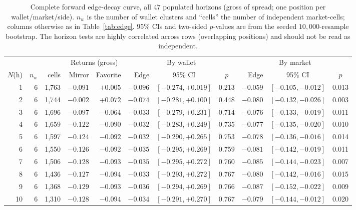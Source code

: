 \documentclass[11pt]{article}
\begin{document}
\begin{table}[p]
\centering
\caption{Complete forward edge-decay curve, all $47$ populated horizons (gross of spread; one
position per wallet/market/side). $n_w$ is the number of wallet clusters and ``cells'' the
number of independent market-cells; columns otherwise as in Table~\ref{tab:edge}. $95\%$ CIs
and two-sided $p$-values are from the seeded $10{,}000$-resample bootstrap. The horizon tests
are highly correlated across rows (overlapping positions) and should not be read as
independent.}
\label{tab:edgefull}
\scriptsize
\setlength{\tabcolsep}{3pt}
\begin{tabular}{@{}rrr rr rcc rcc@{}}
\toprule
& & & \multicolumn{2}{c}{Returns (gross)} & \multicolumn{3}{c}{By wallet} & \multicolumn{3}{c}{By market} \\
\cmidrule(lr){4-5}\cmidrule(lr){6-8}\cmidrule(lr){9-11}
$N$(h) & $n_w$ & cells & Mirror & Favorite & Edge & 95\% CI & $p$ & Edge & 95\% CI & $p$ \\
\midrule
1 & 6 & 1{,}763 & $-0.091$ & $+0.005$ & $-0.096$ & $[-0.274,+0.019]$ & 0.213 & $-0.059$ & $[-0.105,-0.012]$ & 0.013 \\
2 & 6 & 1{,}744 & $-0.002$ & $+0.072$ & $-0.074$ & $[-0.281,+0.100]$ & 0.448 & $-0.080$ & $[-0.132,-0.026]$ & 0.003 \\
3 & 6 & 1{,}696 & $-0.097$ & $-0.064$ & $-0.033$ & $[-0.279,+0.231]$ & 0.714 & $-0.076$ & $[-0.133,-0.019]$ & 0.011 \\
4 & 6 & 1{,}659 & $-0.122$ & $-0.090$ & $-0.032$ & $[-0.283,+0.249]$ & 0.735 & $-0.077$ & $[-0.135,-0.020]$ & 0.010 \\
5 & 6 & 1{,}597 & $-0.124$ & $-0.092$ & $-0.032$ & $[-0.290,+0.265]$ & 0.753 & $-0.078$ & $[-0.136,-0.016]$ & 0.014 \\
6 & 6 & 1{,}550 & $-0.126$ & $-0.092$ & $-0.035$ & $[-0.295,+0.269]$ & 0.759 & $-0.081$ & $[-0.142,-0.019]$ & 0.011 \\
7 & 6 & 1{,}506 & $-0.128$ & $-0.093$ & $-0.035$ & $[-0.295,+0.272]$ & 0.760 & $-0.085$ & $[-0.144,-0.023]$ & 0.007 \\
8 & 6 & 1{,}436 & $-0.127$ & $-0.094$ & $-0.033$ & $[-0.293,+0.272]$ & 0.767 & $-0.080$ & $[-0.142,-0.016]$ & 0.015 \\
9 & 6 & 1{,}368 & $-0.129$ & $-0.093$ & $-0.036$ & $[-0.294,+0.269]$ & 0.766 & $-0.087$ & $[-0.152,-0.022]$ & 0.009 \\
10 & 6 & 1{,}310 & $-0.128$ & $-0.094$ & $-0.034$ & $[-0.291,+0.270]$ & 0.767 & $-0.079$ & $[-0.144,-0.012]$ & 0.020 \\

\end{tabular}
\end{table}
\end{document}
